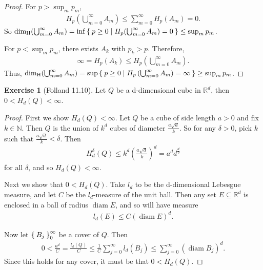 \documentclass[11pt]{amsart}
\theoremstyle{definition}
\newtheorem{ex}[definition]{Exercise}
\newcommand{\R}{\ensuremath{\mathbb{R}}}
\newcommand{\N}{\ensuremath{\mathbb{N}}}
\DeclareMathOperator{\diam}{diam}
\DeclareMathOperator{\dimH}{dim_H}
\begin{document}
\begin{proof}
	For \( p > \sup_{m} p_m \), 
	\begin{align}
		 H_p \left( \bigcup_{m = 0}^\infty A_m \right) 
		 \leq \sum_{m = 0}^\infty H_p(A_m)
		 = 0 .
	\end{align}
	So \( \dimH(\bigcup_{m = 0}^\infty A_m) = \inf \Set{p \geq 0 | H_p(\bigcup_{m = 0}^\infty A_m) = 0} \leq \sup_{m} p_m \).
	
	For \( p < \sup_{m} p_m \), there exists \( A_k \) with \( p_k > p\). Therefore,
	\begin{align}
		\infty
		= H_p(A_k)
		\leq H_p \left( \bigcup_{m = 0}^\infty A_m \right) .
	\end{align}
	Thus, \( \dimH(\bigcup_{m = 0}^\infty A_m) = \sup \Set{p \geq 0 | H_p\left(\bigcup_{m = 0}^\infty A_m\right) = \infty} \geq \sup_{m} p_m \).
\end{proof}

\begin{ex}[Folland 11.10]\label{ex:cube}
	Let \( Q \) be a d-dimensional cube in \( \R^d \), then \( 0 < H_d \left( Q \right) < \infty \).
\end{ex}

\begin{proof}
	First we show \( H_d \left( Q \right) < \infty \). Let \( Q \) be a cube of side length \( a > 0 \) and fix \( k \in \N \). Then \( Q \) is the union of \( k^d \) cubes of diameter \( \frac{a \sqrt{d}}{k} \). So for any \( \delta > 0 \), pick \( k \) such that \( \frac{a \sqrt{d}}{k} < \delta \). Then
	\begin{align}
		H^\delta_d(Q) \leq k^d \left( \frac{a \sqrt{d}}{k} \right)^d = a^d d^{\frac{d}{2}}
	\end{align}
	for all \( \delta \), and so \( H_d \left( Q \right) < \infty \).
	
	Next we show that \( 0 < H_d \left( Q \right) \). Take \( l_d \) to be the d-dimensional Lebesgue measure, and let \( C \) be the \( l_d \)-measure of the unit ball. Then any set \( E \subseteq \R^d \) is enclosed in a ball of radius \( \diam E \), and so will have measure 
	\begin{align}
		l_d(E) \leq C ( \diam E )^d .
	\end{align}
	
	Now let \( \Set{B_j}_0^\infty \) be a cover of \( Q \). Then 
	\begin{align}
		0 < \frac{a^d}{C} = \frac{l_d(Q)}{C} \leq \frac{1}{C} \sum_{j = 0}^\infty l_d(B_j) \leq \sum_{j = 0}^\infty (\diam B_j)^d .
	\end{align}
	Since this holds for any cover, it must be that \( 0 < H_d \left( Q \right) \).
\end{proof}
\end{document}
